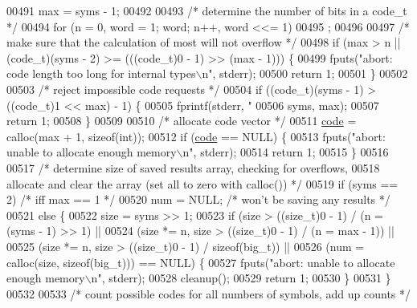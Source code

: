 \begin{DoxyCode}
{{{{00491         max = syms - 1;
00492 
00493     \textcolor{comment}{/* determine the number of bits in a code\_t */}
00494     \textcolor{keywordflow}{for} (n = 0, word = 1; word; n++, word <<= 1)
00495         ;
00496 
00497     \textcolor{comment}{/* make sure that the calculation of most will not overflow */}
00498     \textcolor{keywordflow}{if} (max > n || (code\_t)(syms - 2) >= (((code\_t)0 - 1) >> (max - 1))) \{
00499         fputs(\textcolor{stringliteral}{"abort: code length too long for internal types\(\backslash\)n"}, stderr);
00500         \textcolor{keywordflow}{return} 1;
00501     \}
00502 
00503     \textcolor{comment}{/* reject impossible code requests */}
00504     \textcolor{keywordflow}{if} ((code\_t)(syms - 1) > ((code\_t)1 << max) - 1) \{
00505         fprintf(stderr, \textcolor{stringliteral}{"%
00506                 syms, max);
00507         \textcolor{keywordflow}{return} 1;
00508     \}
00509 
00510     \textcolor{comment}{/* allocate code vector */}
00511     \hyperlink{structcode}{code} = calloc(max + 1, \textcolor{keyword}{sizeof}(\textcolor{keywordtype}{int}));
00512     \textcolor{keywordflow}{if} (\hyperlink{structcode}{code} == NULL) \{
00513         fputs(\textcolor{stringliteral}{"abort: unable to allocate enough memory\(\backslash\)n"}, stderr);
00514         \textcolor{keywordflow}{return} 1;
00515     \}
00516 
00517     \textcolor{comment}{/* determine size of saved results array, checking for overflows,}
00518 \textcolor{comment}{       allocate and clear the array (set all to zero with calloc()) */}
00519     \textcolor{keywordflow}{if} (syms == 2)              \textcolor{comment}{/* iff max == 1 */}
00520         num = NULL;             \textcolor{comment}{/* won't be saving any results */}
00521     \textcolor{keywordflow}{else} \{
00522         size = syms >> 1;
00523         \textcolor{keywordflow}{if} (size > ((\textcolor{keywordtype}{size\_t})0 - 1) / (n = (syms - 1) >> 1) ||
00524                 (size *= n, size > ((\textcolor{keywordtype}{size\_t})0 - 1) / (n = max - 1)) ||
00525                 (size *= n, size > ((\textcolor{keywordtype}{size\_t})0 - 1) / \textcolor{keyword}{sizeof}(big\_t)) ||
00526                 (num = calloc(size, \textcolor{keyword}{sizeof}(big\_t))) == NULL) \{
00527             fputs(\textcolor{stringliteral}{"abort: unable to allocate enough memory\(\backslash\)n"}, stderr);
00528             cleanup();
00529             \textcolor{keywordflow}{return} 1;
00530         \}
00531     \}
00532 
00533     \textcolor{comment}{/* count possible codes for all numbers of symbols, add up counts */}
}}}}}
\end{DoxyCode}
